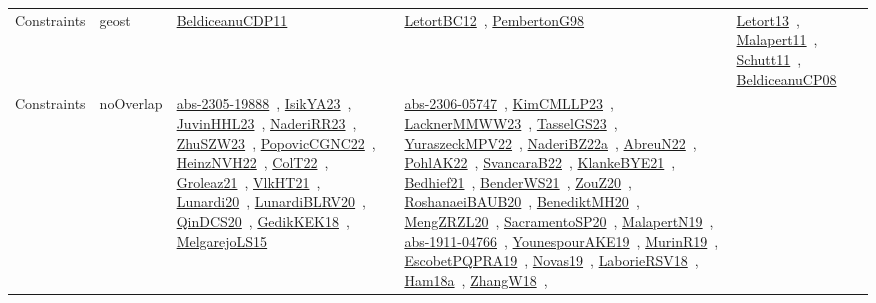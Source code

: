 {\begin{longtable}{lp{3cm}>{\raggedright\arraybackslash}p{6cm}>{\raggedright\arraybackslash}p{6cm}>{\raggedright\arraybackslash}p{8cm}}
Constraints & geost & \href{../works/BeldiceanuCDP11.pdf}{BeldiceanuCDP11}~\cite{BeldiceanuCDP11} & \href{../works/LetortBC12.pdf}{LetortBC12}~\cite{LetortBC12}, \href{../works/PembertonG98.pdf}{PembertonG98}~\cite{PembertonG98} & \href{../works/Letort13.pdf}{Letort13}~\cite{Letort13}, \href{../works/Malapert11.pdf}{Malapert11}~\cite{Malapert11}, \href{../works/Schutt11.pdf}{Schutt11}~\cite{Schutt11}, \href{../works/BeldiceanuCP08.pdf}{BeldiceanuCP08}~\cite{BeldiceanuCP08}\\
Constraints & noOverlap & \href{../works/abs-2305-19888.pdf}{abs-2305-19888}~\cite{abs-2305-19888}, \href{../works/IsikYA23.pdf}{IsikYA23}~\cite{IsikYA23}, \href{../works/JuvinHHL23.pdf}{JuvinHHL23}~\cite{JuvinHHL23}, \href{../works/NaderiRR23.pdf}{NaderiRR23}~\cite{NaderiRR23}, \href{../works/ZhuSZW23.pdf}{ZhuSZW23}~\cite{ZhuSZW23}, \href{../works/PopovicCGNC22.pdf}{PopovicCGNC22}~\cite{PopovicCGNC22}, \href{../works/HeinzNVH22.pdf}{HeinzNVH22}~\cite{HeinzNVH22}, \href{../works/ColT22.pdf}{ColT22}~\cite{ColT22}, \href{../works/Groleaz21.pdf}{Groleaz21}~\cite{Groleaz21}, \href{../works/VlkHT21.pdf}{VlkHT21}~\cite{VlkHT21}, \href{../works/Lunardi20.pdf}{Lunardi20}~\cite{Lunardi20}, \href{../works/LunardiBLRV20.pdf}{LunardiBLRV20}~\cite{LunardiBLRV20}, \href{../works/QinDCS20.pdf}{QinDCS20}~\cite{QinDCS20}, \href{../works/GedikKEK18.pdf}{GedikKEK18}~\cite{GedikKEK18}, \href{../works/MelgarejoLS15.pdf}{MelgarejoLS15}~\cite{MelgarejoLS15} & \href{../works/abs-2306-05747.pdf}{abs-2306-05747}~\cite{abs-2306-05747}, \href{../works/KimCMLLP23.pdf}{KimCMLLP23}~\cite{KimCMLLP23}, \href{../works/LacknerMMWW23.pdf}{LacknerMMWW23}~\cite{LacknerMMWW23}, \href{../works/TasselGS23.pdf}{TasselGS23}~\cite{TasselGS23}, \href{../works/YuraszeckMPV22.pdf}{YuraszeckMPV22}~\cite{YuraszeckMPV22}, \href{../works/NaderiBZ22a.pdf}{NaderiBZ22a}~\cite{NaderiBZ22a}, \href{../works/AbreuN22.pdf}{AbreuN22}~\cite{AbreuN22}, \href{../works/PohlAK22.pdf}{PohlAK22}~\cite{PohlAK22}, \href{../works/SvancaraB22.pdf}{SvancaraB22}~\cite{SvancaraB22}, \href{../works/KlankeBYE21.pdf}{KlankeBYE21}~\cite{KlankeBYE21}, \href{../works/Bedhief21.pdf}{Bedhief21}~\cite{Bedhief21}, \href{../works/BenderWS21.pdf}{BenderWS21}~\cite{BenderWS21}, \href{../works/ZouZ20.pdf}{ZouZ20}~\cite{ZouZ20}, \href{../works/RoshanaeiBAUB20.pdf}{RoshanaeiBAUB20}~\cite{RoshanaeiBAUB20}, \href{../works/BenediktMH20.pdf}{BenediktMH20}~\cite{BenediktMH20}, \href{../works/MengZRZL20.pdf}{MengZRZL20}~\cite{MengZRZL20}, \href{../works/SacramentoSP20.pdf}{SacramentoSP20}~\cite{SacramentoSP20}, \href{../works/MalapertN19.pdf}{MalapertN19}~\cite{MalapertN19}, \href{../works/abs-1911-04766.pdf}{abs-1911-04766}~\cite{abs-1911-04766}, \href{../works/YounespourAKE19.pdf}{YounespourAKE19}~\cite{YounespourAKE19}, \href{../works/MurinR19.pdf}{MurinR19}~\cite{MurinR19}, \href{../works/EscobetPQPRA19.pdf}{EscobetPQPRA19}~\cite{EscobetPQPRA19}, \href{../works/Novas19.pdf}{Novas19}~\cite{Novas19}, \href{../works/LaborieRSV18.pdf}{LaborieRSV18}~\cite{LaborieRSV18}, \href{../works/Ham18a.pdf}{Ham18a}~\cite{Ham18a}, \href{../works/ZhangW18.pdf}{ZhangW18}~\cite{ZhangW18}, 
\end{longtable}}
